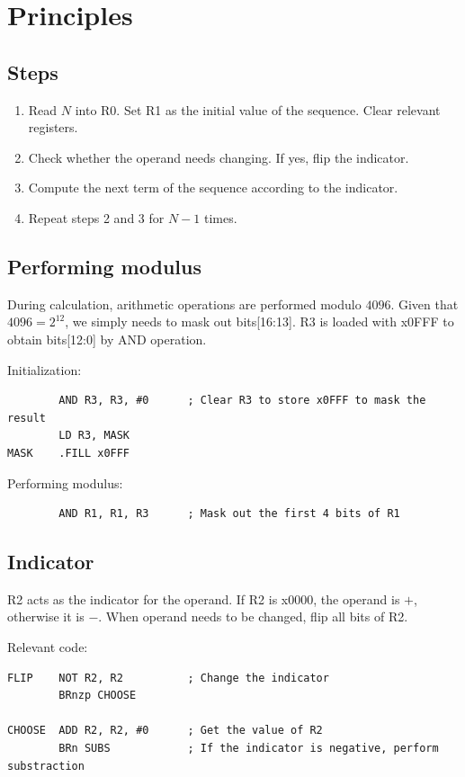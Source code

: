 \documentclass[UTF8]{ctexart}
\begin{document}
\section{Principles}
\subsection{Steps}
\begin{enumerate}
  \item Read $N$ into R0. Set R1 as the initial value of the sequence. Clear relevant registers.
  \item Check whether the operand needs changing. If yes, flip the indicator.
  \item Compute the next term of the sequence according to the indicator.
  \item Repeat steps 2 and 3 for $N-1$ times.
\end{enumerate}
\subsection{Performing modulus}
During calculation, arithmetic operations are performed modulo $4096$. Given that $4096=2^{12}$, 
we simply needs to mask out bits[16:13]. R3 is loaded with x0FFF to obtain bits[12:0] by AND operation.

Initialization:
\begin{lstlisting}
        AND R3, R3, #0      ; Clear R3 to store x0FFF to mask the result
        LD R3, MASK
MASK    .FILL x0FFF
\end{lstlisting}

Performing modulus:
\begin{lstlisting}
        AND R1, R1, R3      ; Mask out the first 4 bits of R1 
\end{lstlisting}

\subsection{Indicator}
R2 acts as the indicator for the operand. If R2 is x0000, the operand is $+$, otherwise it is $-$.
When operand needs to be changed, flip all bits of R2.

Relevant code:
\begin{lstlisting}
FLIP    NOT R2, R2          ; Change the indicator
        BRnzp CHOOSE

CHOOSE  ADD R2, R2, #0      ; Get the value of R2
        BRn SUBS            ; If the indicator is negative, perform substraction 
\end{lstlisting}
\end{document}

